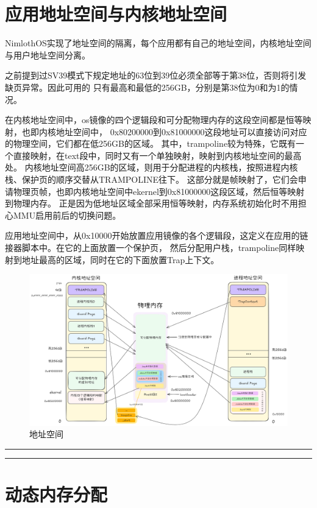 \section{应用地址空间与内核地址空间}

NimlothOS实现了地址空间的隔离，每个应用都有自己的地址空间，内核地址空间与用户地址空间分离。

之前提到过SV39模式下规定地址的63位到39位必须全部等于第38位，否则将引发缺页异常。因此可用的
只有最高和最低的256GB，分别是第38位为0和为1的情况。

在内核地址空间中，os镜像的四个逻辑段和可分配物理内存的这段空间都是恒等映射，也即内核地址空间中，
0x80200000到0x81000000这段地址可以直接访问对应的物理空间，它们都在低256GB的区域。
其中，trampoline较为特殊，它既有一个直接映射，在text段中，同时又有一个单独映射，映射到内核地址空间的最高处。
内核地址空间高256GB的区域，则用于分配进程的内核栈，按照进程内核栈、保护页的顺序交替从TRAMPOLINE往下。
这部分就是帧映射了，它们会申请物理页帧，也即内核地址空间中ekernel到0x81000000这段区域，然后恒等映射到物理内存。
正是因为低地址区域全部采用恒等映射，内存系统初始化时不用担心MMU启用前后的切换问题。

应用地址空间中，从0x10000开始放置应用镜像的各个逻辑段，这定义在应用的链接器脚本中。在它的上面放置一个保护页，
然后分配用户栈，trampoline同样映射到地址最高的区域，同时在它的下面放置Trap上下文。

\begin{figure}[htbp]
    \centering
    \includegraphics[width=1.0\textwidth]{../image/地址空间.png}
    \caption{地址空间}
    \label{fig:地址空间}
\end{figure}

\noindent
\rule{0.4\textwidth}{0.4pt}
\hfill
{}
\hfill
\rule{0.4\textwidth}{0.4pt}

\section{动态内存分配}

